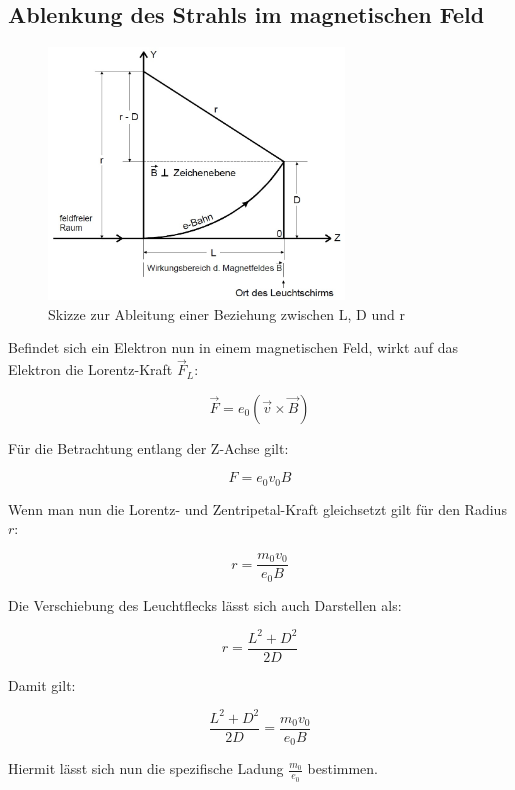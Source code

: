 \subsection{Ablenkung des Strahls im magnetischen Feld}
\begin{figure}[h]
  \centering
  \includegraphics[width=0.7\textwidth]{Grafiken/V501(2)_Abb2.jpg}
  \caption{Skizze zur Ableitung einer Beziehung zwischen L, D und r}
\end{figure}
Befindet sich ein Elektron nun in einem magnetischen Feld, wirkt auf das Elektron die Lorentz-Kraft $\vec{F}_L$:

\begin{equation}
  \vec{F} = e_0 (\vec{v} \times \vec{B})
\end{equation}

Für die Betrachtung entlang der Z-Achse gilt:

\begin{equation}
  F = e_0 v_0 B
\end{equation}

Wenn man nun die Lorentz- und Zentripetal-Kraft gleichsetzt gilt für den Radius $r$:

\begin{equation}
  r = \frac{m_0v_0}{e_0B}
\end{equation}

Die Verschiebung des Leuchtflecks lässt sich auch Darstellen als:

\begin{equation}
  r = \frac{L^2 + D^2}{2D}
\end{equation}

Damit gilt:

\begin{equation}
  \frac{L^2 + D^2}{2D} = \frac{m_0v_0}{e_0B}
\end{equation}

Hiermit lässt sich nun die spezifische Ladung $\frac{m_0}{e_0}$ bestimmen.
